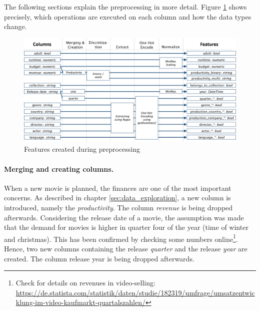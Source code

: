 The following sections explain the preprocessing in more detail. Figure \ref{img:features} shows precisely, which operations are executed on each column and how the data types change.
\begin{figure}[h]
	\includegraphics[width=\textwidth]{images/3_features.png}
	\caption{Features created during preprocessing}
	\label{img:features}
\end{figure}
\FloatBarrier

\paragraph{Merging and creating columns.}
\label{sec:merge_create}
When a new movie is planned, the finances are one of the most important concerns. As described in chapter \ref{sec:data_exploration}, a new column is introduced, namely the \textit{productivity}.
The column \textit{revenue} is being dropped afterwards.
Considering the release date of a movie, the assumption was made that the demand for movies is higher in quarter four of the year (time of winter and christmas). This has been confirmed by checking some numbers online\footnote{Check for details on revenues in video-selling:\\ \hyperref{https://de.statista.com/statistik/daten/studie/182319/umfrage/umsatzentwicklung-im-video-kaufmarkt-quartalszahlen/}{link}{Statista revenue movies}{https://de.statista.com/statistik/daten/studie/182319/umfrage/umsatzentwicklung-im-video-kaufmarkt-quartalszahlen/}}. Hence, two new columns containing the release \textit{quarter} and the release \textit{year} are created. The column release year is being dropped afterwards.


